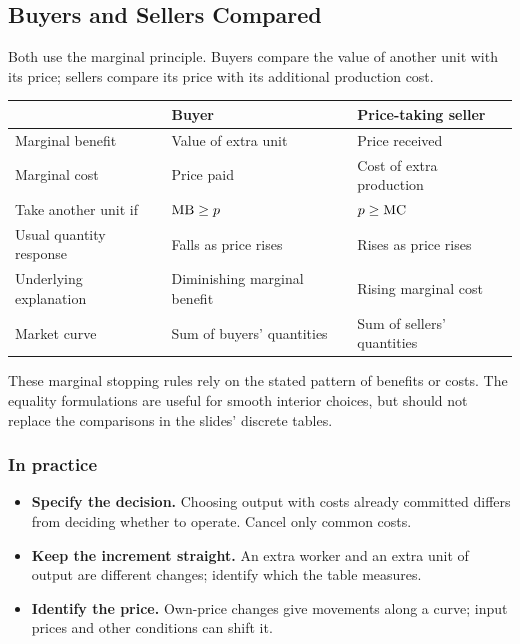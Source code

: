\subsection{Buyers and Sellers Compared}
Both use the marginal principle. Buyers compare the value of another unit
with its price; sellers compare its price with its additional production cost.
\begin{center}\small
\begin{tabular}{lll}
\toprule
&Buyer&Price-taking seller\\
\midrule
Marginal benefit&Value of extra unit&Price received\\
Marginal cost&Price paid&Cost of extra production\\
Take another unit if&$\operatorname{MB}\geq p$&$p\geq\operatorname{MC}$\\
Usual quantity response&Falls as price rises&Rises as price rises\\
Underlying explanation&Diminishing marginal benefit&Rising marginal cost\\
Market curve&Sum of buyers' quantities&Sum of sellers' quantities\\
\bottomrule
\end{tabular}
\end{center}
These marginal stopping rules rely on the stated pattern of benefits or
costs. The equality formulations are useful for smooth interior choices,
but should not replace the comparisons in the slides' discrete tables.

\subsubsection*{In practice}
\begin{itemize}
\item \textbf{Specify the decision.} Choosing output with costs already
committed differs from deciding whether to operate. Cancel only common costs.
\item \textbf{Keep the increment straight.} An extra worker and an extra
unit of output are different changes; identify which the table measures.
\item \textbf{Identify the price.} Own-price changes give movements along
a curve; input prices and other conditions can shift it.
\end{itemize}
